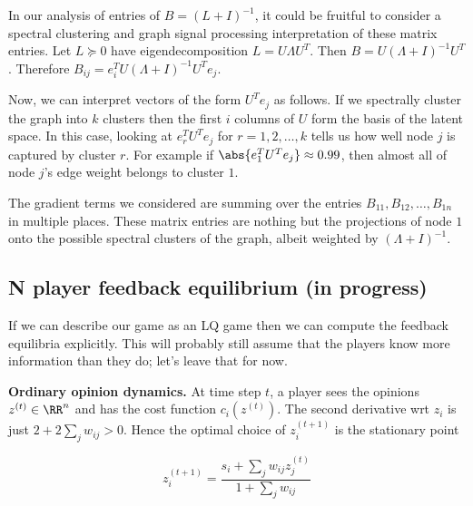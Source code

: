 In our analysis of entries of $B = (L + I)^{-1}$, it could be fruitful to consider a spectral clustering and graph signal processing interpretation of these matrix entries. Let $L \succeq 0$ have eigendecomposition $L = U\Lambda U^T$. Then $B = U (\Lambda + I)^{-1} U^T$. Therefore $B_{ij} = e_i^T U (\Lambda +I)^{-1} U^T e_j$. 

Now, we can interpret vectors of the form $U^T e_j$ as follows. If we spectrally cluster the graph into $k$ clusters then the first $i$ columns of $U$ form the basis of the latent space. In this case, looking at $e_r^T U^T e_j$ for $r = 1, 2, \dots, k$ tells us how well node $j$ is captured by cluster $r$. For example if  $\abs{e_1^T U^T e_j} \approx 0.99$, then almost all of node $j$'s edge weight belongs to cluster $1$. 

The gradient terms we considered are summing over the entries $B_{11}, B_{12}, \dots, B_{1n}$ in multiple places. These matrix entries are nothing but the projections of node $1$ onto the possible spectral clusters of the graph, albeit weighted by $(\Lambda + I)^{-1}$. 

\subsection{N player feedback equilibrium (in progress)}

If we can describe our game as an LQ game then we can compute the feedback equilibria explicitly. This will probably still assume that the players know more information than they do; let's leave that for now. 





{\bf Ordinary opinion dynamics.} At time step $t$, a player sees the opinions $z^{(t)} \in \RR^n$ and has the cost function $c_i(z^{(t)})$. The second derivative wrt $z_i$ is just $2 + 2 \sum_j w_{ij} > 0$. Hence the optimal choice of $z_i^{(t+1)}$ is the stationary point

\[
z_i^{(t+1)} = \frac{s_i + \sum_j w_{ij} z_j^{(t)}}{1 + \sum_j w_{ij}}
\]

